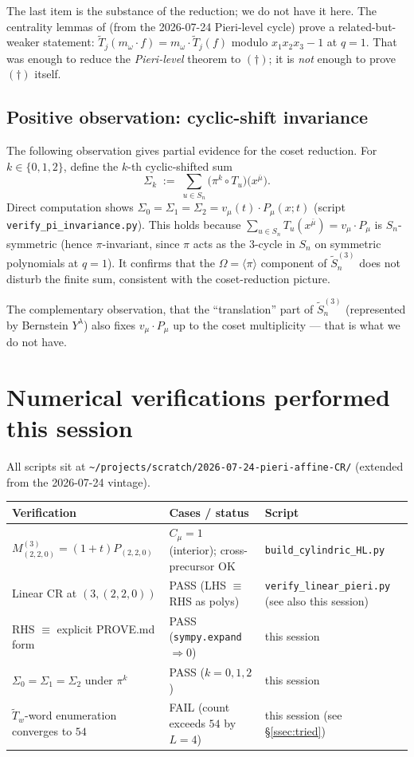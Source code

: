 \documentclass[11pt]{article}
\theoremstyle{definition}
\newcommand{\bmu}{\bar{\mu}}
\newcommand{\wt}[1]{\widetilde{#1}}
\newcommand{\Sn}{S_n}
\newcommand{\afSn}{\wt{S}_n}
\newcommand{\dgg}{\dagger}
\begin{document}
The last item is the substance of the reduction; we do not have it here.
The centrality lemmas of \cite[\S 2]{ClioPieriAffine} (from the 2026-07-24
Pieri-level cycle) prove a related-but-weaker statement:
$\wt T_j(m_\omega \cdot f) = m_\omega \cdot \wt T_j(f)$ modulo
$x_1 x_2 x_3 - 1$ at $q=1$. That was enough to reduce the
\emph{Pieri-level} theorem to $(\dgg)$; it is \emph{not} enough to prove
$(\dgg)$ itself.

\subsection{Positive observation: cyclic-shift invariance}
\label{ssec:pi-invariance}

The following observation gives partial evidence for the coset reduction.
For $k \in \{0, 1, 2\}$, define the $k$-th cyclic-shifted sum
\[
   \Sigma_k \;:=\; \sum_{u \in \Sn} \bigl(\pi^k \circ T_u\bigr)\bigl(x^{\bmu}\bigr).
\]
Direct computation shows $\Sigma_0 = \Sigma_1 = \Sigma_2 =
v_\mu(t) \cdot P_\mu(x; t)$ (script \verb|verify_pi_invariance.py|).
This holds because
$\sum_{u \in \Sn} T_u(x^\bmu) = v_\mu \cdot P_\mu$ is $\Sn$-symmetric
(hence $\pi$-invariant, since $\pi$ acts as the $3$-cycle in $\Sn$
on symmetric polynomials at $q=1$). It confirms that the $\Omega = \langle \pi\rangle$
component of $\afSn^{(3)}$ does not disturb the finite sum, consistent
with the coset-reduction picture.

The complementary observation, that the ``translation'' part of
$\afSn^{(3)}$ (represented by Bernstein $Y^\lambda$) also fixes
$v_\mu \cdot P_\mu$ up to the coset multiplicity — that is what we do not
have.

\section{Numerical verifications performed this session}
\label{sec:numerics}

All scripts sit at
\verb|~/projects/scratch/2026-07-24-pieri-affine-CR/| (extended from the
2026-07-24 vintage).

\begin{center}
\begin{tabular}{|l|l|l|}
\hline
Verification & Cases / status & Script \\
\hline
$M^{(3)}_{(2,2,0)} = (1+t) P_{(2,2,0)}$ & $C_\mu = 1$ (interior);
  cross-precursor OK & \verb|build_cylindric_HL.py| \\
Linear CR at $(3, (2,2,0))$
  & PASS (LHS $\equiv$ RHS as polys)
  & \verb|verify_linear_pieri.py| (see also this session) \\
RHS $\equiv$ explicit PROVE.md form
  & PASS (\verb|sympy.expand| $\Longrightarrow 0$)
  & this session \\
$\Sigma_0 = \Sigma_1 = \Sigma_2$ under $\pi^k$
  & PASS ($k = 0, 1, 2$)
  & this session \\
$\wt T_w$-word enumeration converges to $54$
  & FAIL (count exceeds $54$ by $L = 4$)
  & this session (see \S\ref{ssec:tried}) \\
\hline
\end{tabular}
\end{center}
\end{document}

